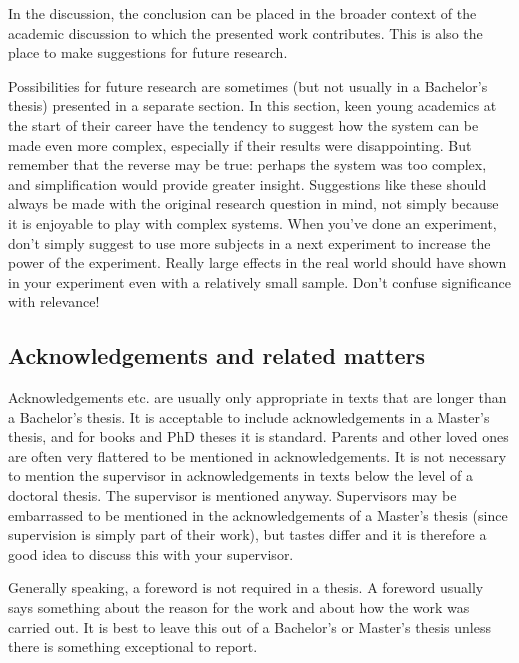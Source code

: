 In the discussion, the conclusion can be placed in the broader context of the academic discussion to which the presented work contributes. This is also the place to make suggestions for future research.

Possibilities for future research are sometimes (but not usually in a Bachelor's thesis) presented in a separate section.  In this section, keen young academics at the start of their career have the tendency to suggest how the system can be made even more complex, especially if  their results were disappointing. But remember that the reverse may be true: perhaps the system was too complex, and simplification would provide greater insight. Suggestions like these should always be made with the original research question in mind, not simply because it is enjoyable to play with complex systems. When you've done an experiment, don't simply suggest to use more subjects in a next experiment to increase the power of the experiment. Really large effects in the real world should have shown in your experiment even with a relatively small sample. Don't confuse significance with relevance!

\subsection{Acknowledgements and related matters}\label{sec:_acknowledgements}
Acknowledgements etc. are usually only appropriate in texts that are longer than a Bachelor's thesis. It is acceptable to include acknowledgements in a Master's thesis, and for books and PhD theses it is standard. Parents and other loved ones are often very flattered to be mentioned in acknowledgements. It is not necessary to mention the supervisor in acknowledgements in texts below the level of a doctoral thesis. The supervisor is mentioned anyway. Supervisors may be embarrassed to be mentioned in the acknowledgements of a Master's thesis (since supervision is simply part of their work), but tastes differ and it is therefore a good idea to discuss this with your supervisor.

Generally speaking, a foreword is not required in a thesis. A foreword usually says something about the reason for the work and about how the work was carried out. It is best to leave this out of a Bachelor's or Master's thesis unless there is something exceptional to report.

